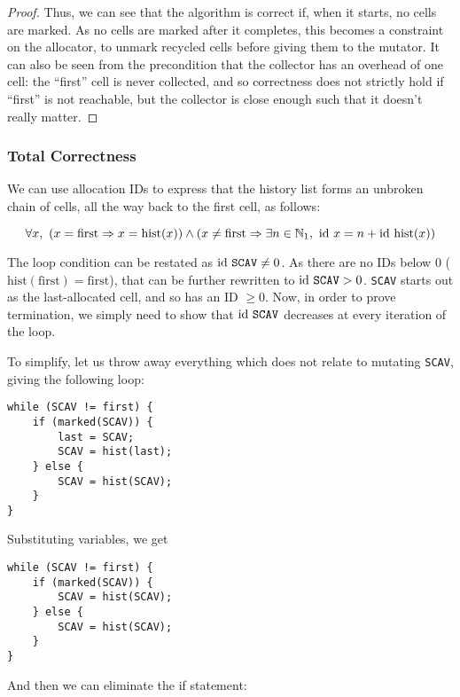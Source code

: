 \begin{proof}
  Thus, we can see that the algorithm is correct if, when it starts,
  no cells are marked. As no cells are marked after it completes, this
  becomes a constraint on the allocator, to unmark recycled cells
  before giving them to the mutator. It can also be seen from the
  precondition that the collector has an overhead of one cell: the
  ``first'' cell is never collected, and so correctness does not
  strictly hold if ``first'' is not reachable, but the collector is
  close enough such that it doesn't really matter.
\end{proof}

\subsubsection{Total Correctness}
\label{sec:marksweep-example-total}

We can use allocation IDs to express that the history list forms an
unbroken chain of cells, all the way back to the first cell, as
follows:

\[\forall x,\ \left(x = \mathrm{first} \Rightarrow x =
  \mathrm{hist}(x)\right) \land \left(x \neq \mathrm{first} \Rightarrow
  \exists n \in \mathbb N_{1},\ \mathrm{id}~x = n +
  \mathrm{id}~\mathrm{hist}(x)\right)\]

The loop condition can be restated as $\mathrm{id}~\mathtt{SCAV} \neq 0$. As
there are no IDs below 0 ($\mathrm{hist}(\mathrm{first}) =
\mathrm{first}$), that can be further rewritten to $\mathrm{id}~\mathtt{SCAV}
> 0$. \texttt{SCAV} starts out as the last-allocated cell, and so has
an ID $\geq 0$. Now, in order to prove termination, we simply need to
show that $\mathrm{id}~\mathtt{SCAV}$ decreases at every iteration of the
loop.

To simplify, let us throw away everything which does not relate to
mutating \texttt{SCAV}, giving the following loop:

\begin{lstlisting}
while (SCAV != first) {
    if (marked(SCAV)) {
        last = SCAV;
        SCAV = hist(last);
    } else {
        SCAV = hist(SCAV);
    }
}
\end{lstlisting}

Substituting variables, we get

\begin{lstlisting}
while (SCAV != first) {
    if (marked(SCAV)) {
        SCAV = hist(SCAV);
    } else {
        SCAV = hist(SCAV);
    }
}
\end{lstlisting}

And then we can eliminate the if statement:

